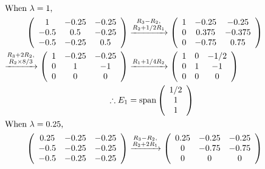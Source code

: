 \documentclass[12pt]{article}
\begin{document}
\begin{align*}
\intertext{When $\lambda = 1$,}
\left( \begin{array}{ccc} 
1 & -0.25 & -0.25\\
-0.5 & 0.5 & -0.25\\
-0.5 & -0.25 & 0.5\\
\end{array} \right)
&
\xrightarrow{\substack{R_3 - R_2,\\R_2 + 1/2R_1}}
\left( \begin{array}{ccc} 
1 & -0.25 & -0.25\\
0 & 0.375 & -0.375\\
0 & -0.75 & 0.75\\
\end{array} \right)\\
\xrightarrow{\substack{R_3 + 2R_2,\\R_2 \times 8/3}}
\left( \begin{array}{ccc} 
1 & -0.25 & -0.25\\
0 & 1 & -1\\
0 & 0 & 0\\
\end{array} \right)
&
\xrightarrow{\substack{R_1 + 1/4R_2}}
\left( \begin{array}{ccc} 
1 & 0 & -1/2\\
0 & 1 & -1\\
0 & 0 & 0\\
\end{array} \right)\\
\therefore E_1 &= \text{span}
\left( \begin{array}{c} 
1/2\\
1\\
1\\
\end{array} \right)\\
\intertext{When $\lambda = 0.25$,}
\left( \begin{array}{ccc} 
0.25 & -0.25 & -0.25\\
-0.5 & -0.25 & -0.25\\
-0.5 & -0.25 & -0.25\\
\end{array} \right)
&
\xrightarrow{\substack{R_3 - R_2,\\R_2 + 2R_1}}
\left( \begin{array}{ccc} 
0.25 & -0.25 & -0.25\\
0 & -0.75 & -0.75\\
0 & 0 & 0\\
\end{array} \right)\\

\end{align*}
\end{document}
